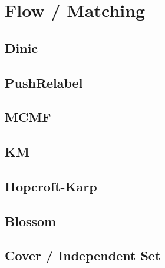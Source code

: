 \documentclass[a4paper,10pt,twocolumn,oneside,x11names]{article}
\begin{document}
%

\section{Flow / Matching}

\subsection{Dinic}


\subsection{PushRelabel}


%

\subsection{MCMF}


\subsection{KM}


\subsection{Hopcroft-Karp}


\subsection{Blossom}


% 

\subsection{Cover / Independent Set}

\end{document}
